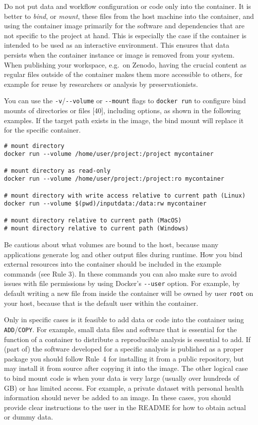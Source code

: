 \documentclass[10pt,letterpaper]{article}
\begin{document}
Do not put data and workflow configuration or code only into the
container. It is better to \emph{bind}, or \emph{mount}, these files
from the host machine into the container, and using the container image
primarily for the software and dependencies that are not specific to the
project at hand. This is especially the case if the container is
intended to be used as an interactive environment. This ensures that
data persists when the container instance or image is removed from your
system. When publishing your workspace, e.g.~on Zenodo, having the
crucial content as regular files outside of the container makes them
more accessible to others, for example for reuse by researchers or
analysis by preservationists.

You can use the \texttt{-v}/\texttt{-\/-volume} or \texttt{-\/-mount}
flags to \texttt{docker\ run} to configure bind mounts of directories or
files {[}40{]}, including options, as shown in the following examples.
If the target path exists in the image, the bind mount will replace it
for the specific container.

\begin{verbatim}
# mount directory
docker run --volume /home/user/project:/project mycontainer

# mount directory as read-only
docker run --volume /home/user/project:/project:ro mycontainer

# mount directory with write access relative to current path (Linux)
docker run --volume $(pwd)/inputdata:/data:rw mycontainer

# mount directory relative to current path (MacOS)
# mount directory relative to current path (Windows)
\end{verbatim}

Be cautious about what volumes are bound to the host, because many
applications generate log and other output files during runtime. How you
bind external resources into the container should be included in the
example commands (see Rule 3). In these commands you can also make sure
to avoid issues with file permissions by using Docker's
\texttt{-\/-user} option. For example, by default writing a new file
from inside the container will be owned by user \texttt{root} on your
host, because that is the default user within the container.

Only in specific cases is it feasible to add data or code into the
container using \texttt{ADD}/\texttt{COPY}. For example, small data
files and software that is essential for the function of a container to
distribute a reproducible analysis is essential to add. If (part of) the
software developed for a specific analysis is published as a proper
package you should follow Rule~4 for installing it from a public
repository, but may install it from source after copying it into the
image. The other logical case to bind mount code is when your data is
very large (usually over hundreds of GB) or has limited access. For
example, a private dataset with personal health information should never
be added to an image. In these cases, you should provide clear
instructions to the user in the README for how to obtain actual or dummy
data.
\end{document}
